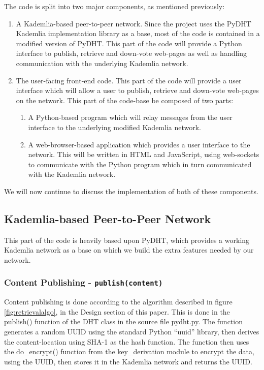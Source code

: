 The code is split into two major components, as mentioned previously:
\begin{enumerate}
	\item{A Kademlia-based peer-to-peer network. Since the project uses the PyDHT Kademlia implementation library as a base, most of the code is contained in a modified version of PyDHT.
	This part of the code will provide a Python interface to publish, retrieve and down-vote web-pages as well as handling communication with the underlying Kademlia network.}
	\item{The user-facing front-end code. This part of the code will provide a user interface which will allow a user to publish, retrieve and down-vote web-pages
	on the network. This part of the code-base be composed of two parts:
		\begin{enumerate}
		    \item A Python-based program which will relay messages from the user interface to the underlying modified Kademlia network.
			\item A web-browser-based application which provides a user interface to the network. This will be written in HTML and JavaScript, using web-sockets to communicate
			with the Python program which in turn communicated with the Kademlia network.
		\end{enumerate}
	}
\end{enumerate}

We will now continue to discuss the implementation of both of these components.

\subsection{Kademlia-based Peer-to-Peer Network}

This part of the code is heavily based upon PyDHT, which provides a working Kademlia network as a base on which we build the extra features needed by our network.

\subsubsection{Content Publishing  - \texttt{publish(content)}}

Content publishing is done according to the algorithm described in figure \ref{fig:retrievalalgo}, in the Design section of this paper. This is done in the
publish() function of the DHT class in the source file pydht.py. The function generates a random UUID using the standard Python ``uuid'' library, then derives
the content-location using SHA-1 as the hash function. The function then uses the do\_encrypt() function from the key\_derivation module
to encrypt the data, using the UUID, then stores it in the Kademlia network and returns the UUID.

